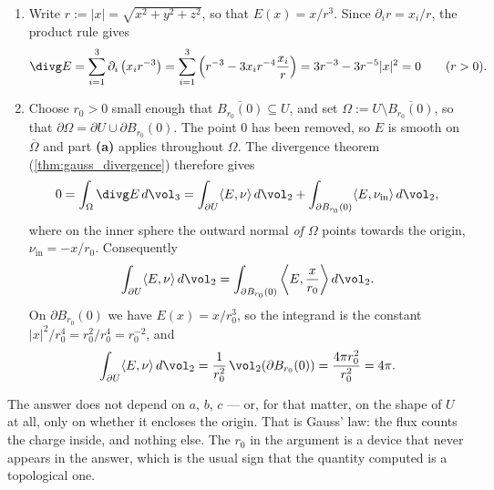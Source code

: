 \begin{exercisesolution}
\label{sol:gauss_law_ellipsoid_flux}
\begin{enumerate}[label=\textbf{(\alph*)}]
  \item Write $r := \lvert x\rvert = \sqrt{x^2+y^2+z^2}$, so that $E(x) = x/r^3$. Since
    $\partial_i r = x_i/r$, the product rule gives
\[\divg E = \sum_{i=1}^3 \partial_i \left(x_i r^{-3}\right) = \sum_{i=1}^3 \left(r^{-3} - 3 x_i r^{-4} \frac{x_i}{r}\right) = 3r^{-3} - 3r^{-5} \lvert x\rvert^2 = 0 \qquad (r > 0).\]

  \item Choose $r_0 > 0$ small enough that $\overline{B_{r_0}(0)} \subseteq U$, and set
    $\Omega := U \setminus \overline{B_{r_0}(0)}$, so that $\partial \Omega = \partial U \cup \partial B_{r_0}(0)$.
    The point $0$ has been removed, so $E$ is smooth on $\overline{\Omega}$ and part \textbf{(a)}
    applies throughout $\Omega$. The divergence theorem (\cref{thm:gauss_divergence}) therefore gives
\[0 = \int_\Omega \divg E \, d\vol_3 = \int_{\partial U} \langle E,\nu\rangle \, d\vol_2 + \int_{\partial B_{r_0}(0)} \langle E,\nu_{\mathrm{in}}\rangle \, d\vol_2,\]
    where on the inner sphere the outward normal \emph{of $\Omega$} points towards the origin,
    $\nu_{\mathrm{in}} = -x/r_0$. Consequently
\[\int_{\partial U} \langle E,\nu\rangle \, d\vol_2 = \int_{\partial B_{r_0}(0)} \left\langle E, \frac{x}{r_0}\right\rangle d\vol_2 .\]
    On $\partial B_{r_0}(0)$ we have $E(x) = x/r_0^3$, so the integrand is the constant
    $\lvert x\rvert^2/r_0^4 = r_0^2/r_0^4 = r_0^{-2}$, and
\[\int_{\partial U} \langle E,\nu\rangle \, d\vol_2 = \frac{1}{r_0^2}\,\vol_2(\partial B_{r_0}(0)) = \frac{4\pi r_0^2}{r_0^2} = 4\pi.\]
\end{enumerate}
\begin{remark}
The answer does not depend on $a$, $b$, $c$ --- or, for that matter, on the shape of $U$ at all,
only on whether it encloses the origin. That is Gauss' law: the flux counts the charge inside, and
nothing else. The $r_0$ in the argument is a device that never appears in the answer, which is the
usual sign that the quantity computed is a topological one.
\end{remark}
\end{exercisesolution}

